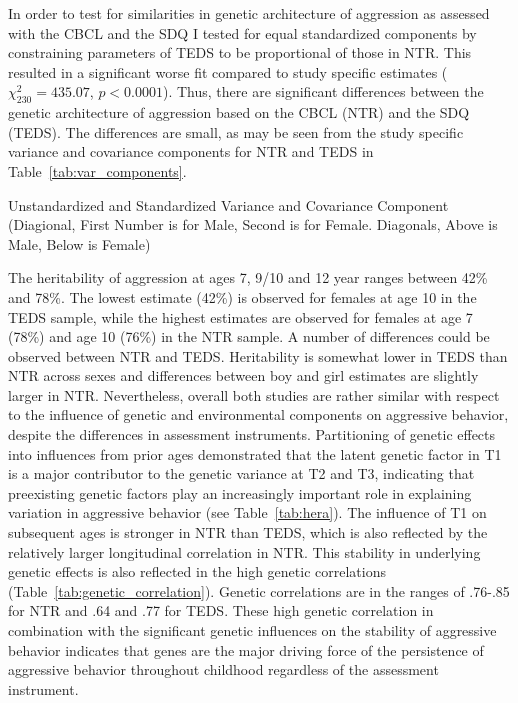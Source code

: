 In order to test for similarities in genetic architecture of aggression as assessed with the CBCL and the SDQ I tested for equal standardized components by constraining parameters of TEDS to be proportional of those in NTR\@.
This resulted in a significant worse fit compared to study specific estimates ($\chi^2_{230}= 435.07$, $p<0.0001$).
Thus, there are significant differences between the genetic architecture of aggression based on the CBCL (NTR) and the SDQ (TEDS).
The differences are small, as may be seen from the study specific variance and covariance components for NTR and TEDS in Table~\ref{tab:var_components}.
\begin{table}
  \centering
  \caption[Unstandardized and Standardized Variance and Covariance Component]{Unstandardized and Standardized Variance and Covariance Component (Diagional,
    First Number is for Male, Second is for Female.
    Diagonals, Above is Male, Below is Female)}\label{tab:var_components}
\end{table}
The heritability of aggression at ages 7, 9/10 and 12 year ranges between 42\% and 78\%.  The lowest estimate (42\%) is observed for females at age 10 in the TEDS sample, while the highest estimates are observed for females at age 7 (78\%) and age 10 (76\%) in the NTR sample.
A number of differences could be observed between NTR and TEDS.
Heritability is somewhat lower in TEDS than NTR across sexes and differences between boy and girl estimates are slightly larger in NTR.
Nevertheless, overall both studies are rather similar with respect to the influence of genetic and environmental components on aggressive behavior, despite the differences in assessment instruments.
Partitioning of genetic effects into influences from prior ages demonstrated that the latent genetic factor in T1 is a major contributor to the genetic variance at T2 and T3, indicating that preexisting genetic factors play an increasingly important role in explaining variation in aggressive behavior (see Table~\ref{tab:hera}).
The influence of T1 on subsequent ages is stronger in NTR than TEDS, which is also reflected by the relatively larger longitudinal correlation in NTR.
This stability in underlying genetic effects is also reflected in the high genetic correlations (Table~\ref{tab:genetic_correlation}).
Genetic correlations are in the ranges of .76-.85 for NTR and .64 and .77 for TEDS.
These high genetic correlation in combination with the significant genetic influences on the stability of aggressive behavior indicates that genes are the major driving force of the persistence of aggressive behavior throughout childhood regardless of the assessment instrument. 

